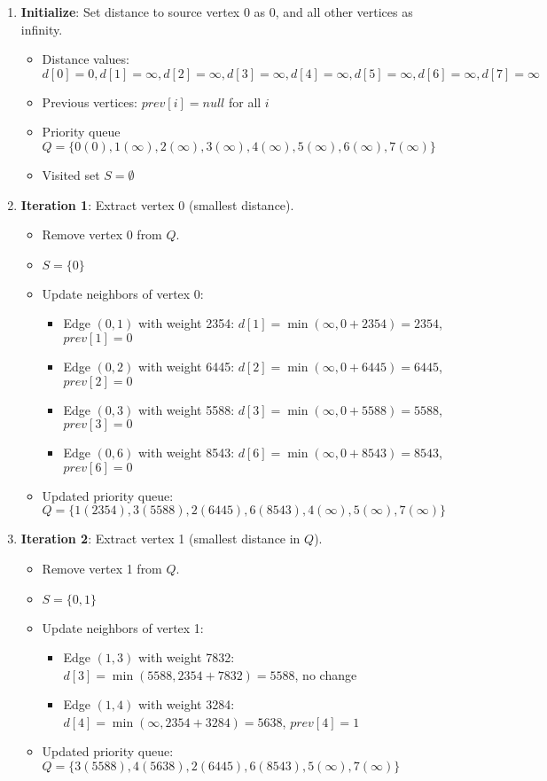 \documentclass{article}
\theoremstyle{definition}
\begin{document}
\begin{enumerate}
\item \textbf{Initialize}: Set distance to source vertex 0 as 0, and all other vertices as infinity.
   \begin{itemize}
   \item Distance values: $d[0] = 0, d[1] = \infty, d[2] = \infty, d[3] = \infty, d[4] = \infty, d[5] = \infty, d[6] = \infty, d[7] = \infty$
   \item Previous vertices: $prev[i] = null$ for all $i$
   \item Priority queue $Q = \{0(0), 1(\infty), 2(\infty), 3(\infty), 4(\infty), 5(\infty), 6(\infty), 7(\infty)\}$
   \item Visited set $S = \emptyset$
   \end{itemize}

\item \textbf{Iteration 1}: Extract vertex 0 (smallest distance).
   \begin{itemize}
   \item Remove vertex 0 from $Q$.
   \item $S = \{0\}$
   \item Update neighbors of vertex 0:
     \begin{itemize}
     \item Edge $(0,1)$ with weight 2354: $d[1] = \min(\infty, 0 + 2354) = 2354$, $prev[1] = 0$
     \item Edge $(0,2)$ with weight 6445: $d[2] = \min(\infty, 0 + 6445) = 6445$, $prev[2] = 0$
     \item Edge $(0,3)$ with weight 5588: $d[3] = \min(\infty, 0 + 5588) = 5588$, $prev[3] = 0$
     \item Edge $(0,6)$ with weight 8543: $d[6] = \min(\infty, 0 + 8543) = 8543$, $prev[6] = 0$
     \end{itemize}
   \item Updated priority queue: $Q = \{1(2354), 3(5588), 2(6445), 6(8543), 4(\infty), 5(\infty), 7(\infty)\}$
   \end{itemize}

\item \textbf{Iteration 2}: Extract vertex 1 (smallest distance in $Q$).
   \begin{itemize}
   \item Remove vertex 1 from $Q$.
   \item $S = \{0, 1\}$
   \item Update neighbors of vertex 1:
     \begin{itemize}
     \item Edge $(1,3)$ with weight 7832: $d[3] = \min(5588, 2354 + 7832) = 5588$, no change
     \item Edge $(1,4)$ with weight 3284: $d[4] = \min(\infty, 2354 + 3284) = 5638$, $prev[4] = 1$
     \end{itemize}
   \item Updated priority queue: $Q = \{3(5588), 4(5638), 2(6445), 6(8543), 5(\infty), 7(\infty)\}$
   \end{itemize}


\end{enumerate}
\end{document}
